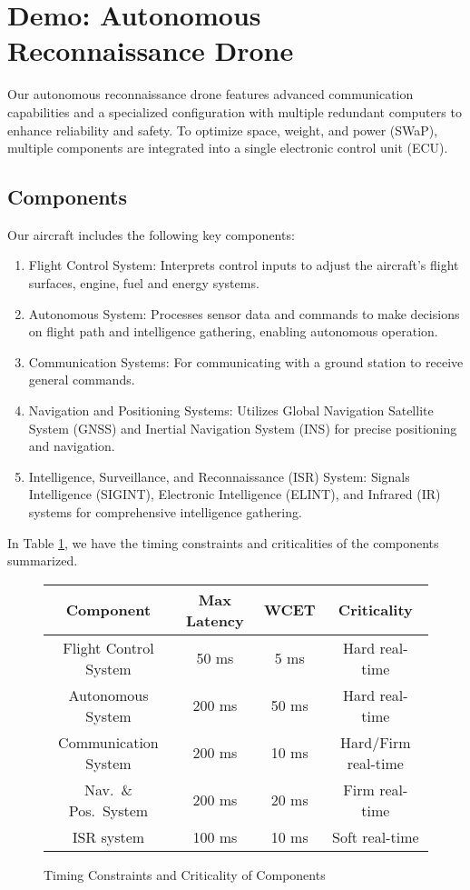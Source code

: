 \newpage
\section{Demo: Autonomous Reconnaissance Drone}
Our autonomous reconnaissance drone features advanced communication capabilities and a specialized configuration with multiple redundant computers  to enhance reliability and safety. 
To optimize space, weight, and power (SWaP), multiple components are integrated into a single electronic control unit (ECU).

\subsection{Components}
Our aircraft includes the following key components:
\begin{enumerate}[label=P\arabic*)]
	\item Flight Control System: 
		Interprets control inputs to adjust the aircraft's flight surfaces, engine, fuel and energy systems.
	\item Autonomous System: 
		Processes sensor data and commands to make decisions on flight path and intelligence gathering, enabling autonomous operation.
	\item Communication Systems: 
		For communicating with a ground station to receive general commands.
	\item Navigation and Positioning Systems: 
		Utilizes Global Navigation Satellite System (GNSS) and Inertial Navigation System (INS) for precise positioning and navigation.
	\item Intelligence, Surveillance, and Reconnaissance (ISR) System: 
		Signals Intelligence (SIGINT), Electronic Intelligence (ELINT), and Infrared (IR) systems for comprehensive intelligence gathering.
\end{enumerate}

In Table \ref{tbl:drone}, we have the timing constraints and criticalities of the components summarized.

\begin{figure}[ht]
	\centering
	\begin{tabular}{c | c | c | c}
		Component & Max Latency & WCET & Criticality \\\hline
		Flight Control System & 50 ms & 5 ms & Hard real-time \\
		Autonomous System & 200 ms & 50 ms & Hard real-time \\
		Communication System & 200 ms & 10 ms & Hard/Firm real-time \\
		Nav.\ \& Pos.\ System & 200 ms & 20 ms & Firm real-time \\
		ISR system & 100 ms & 10 ms & Soft real-time \\
	\end{tabular}
	\caption{Timing Constraints and Criticality of Components}
	\label{tbl:drone}
\end{figure}


